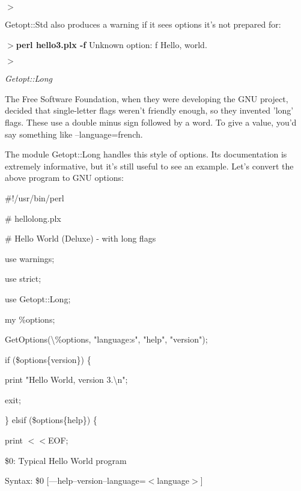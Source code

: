 \documentclass[a4paper,11pt]{book}
\begin{document}
\noindent $>$

\noindent 

\noindent Getopt::Std also produces a warning if it sees options it's not prepared for:

\noindent 

\noindent $>$\textbf{perl hello3.plx -f }Unknown option: f Hello, world.

\noindent $>$

\noindent 

\noindent \textit{Getopt::Long}

\noindent The Free Software Foundation, when they were developing the GNU project, decided that single-letter flags weren't friendly enough, so they invented 'long' flags. These use a double minus sign followed by a word. To give a value, you'd say something like --language=french.

\noindent 

\noindent The module Getopt::Long handles this style of options. Its documentation is extremely informative, but it's still useful to see an example. Let's convert the above program to GNU options:

\noindent 

\noindent \#!/usr/bin/perl

\noindent \# hellolong.plx

\noindent \# Hello World (Deluxe) - with long flags

\noindent use warnings;

\noindent use strict;

\noindent 

\noindent use Getopt::Long;

\noindent my \%options;

\noindent GetOptions(\textbackslash \%options, "language:s", "help", "version");

\noindent 

\noindent if (\$options\{version\}) \{

\noindent print "Hello World, version 3.\textbackslash n";

\noindent exit;

\noindent \} elsif (\$options\{help\}) \{

\noindent print $<$$<$EOF;

\noindent 

\noindent \$0: Typical Hello World program

\noindent 

\noindent Syntax: \$0 [---help\textbar --version\textbar --language=$<$language$>$]
\end{document}
